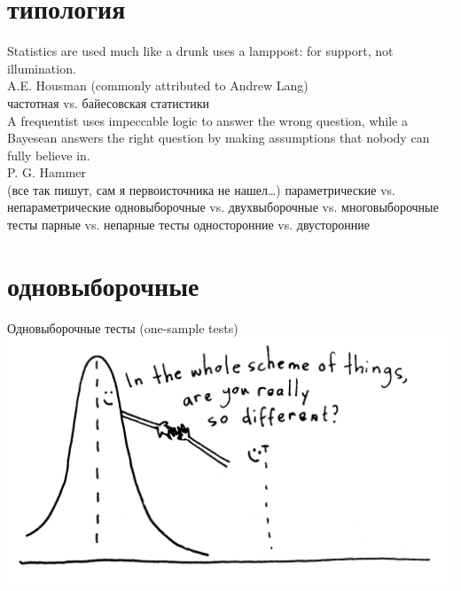 \section{типология}
\begin{frame}
\vfill
Statistics are used much like a drunk uses a lamppost: for support, not illumination.\\ \hfill A.E. Housman (commonly attributed to Andrew Lang)\\
\vfill
частотная vs. байесовская статистики \\
A frequentist uses impeccable logic to answer the wrong question, while a Bayesean answers the right question by making assumptions that nobody can fully believe in.\\ \hfill P. G. Hammer\\
\hfill {\footnotesize (все так пишут, сам я первоисточника не нашел\dots)}
\vfill
параметрические vs. непараметрические
\vfill
одновыборочные vs. двухвыборочные vs. многовыборочные тесты
\vfill
парные vs. непарные тесты
\vfill
односторонние vs. двусторонние
\end{frame}
\section{одновыборочные}
\begin{frame}{Одновыборочные тесты (one-sample tests)}
\vfill
\includegraphics[width=\linewidth]{onesample.jpg}
\end{frame}
